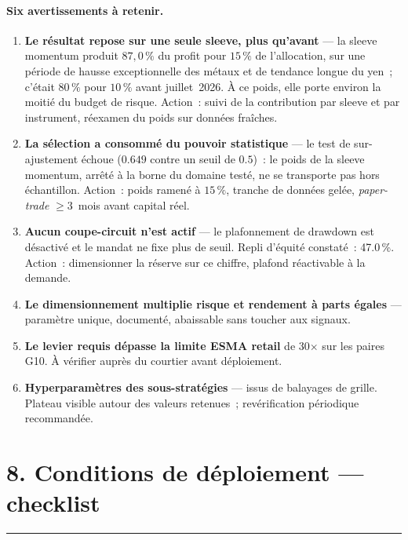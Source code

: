 \documentclass[11pt, a4paper]{scrartcl}
\begin{document}
\paragraph{Six avertissements à retenir.}
\begin{enumerate}[leftmargin=1.2em]
\item \textbf{Le résultat repose sur une seule sleeve, plus qu'avant} --- la sleeve
momentum produit $87{,}0\,\%$ du profit pour $15\,\%$ de l'allocation, sur une période de
hausse exceptionnelle des métaux et de tendance longue du yen~; c'était $80\,\%$ pour
$10\,\%$ avant juillet~2026. À ce poids, elle porte environ la moitié du budget de
risque. Action~: suivi de la contribution par sleeve et par instrument, réexamen du
poids sur données fraîches.
\item \textbf{La sélection a consommé du pouvoir statistique} --- le test de
sur-ajustement échoue ($0.649$ contre un seuil de $0.5$)~: le poids de la sleeve
momentum, arrêté à la borne du domaine testé, ne se transporte pas hors échantillon.
Action~: poids ramené à $15\,\%$, tranche de données gelée, \emph{paper-trade}
$\geq 3$~mois avant capital réel.
\item \textbf{Aucun coupe-circuit n'est actif} --- le plafonnement de drawdown est
désactivé et le mandat ne fixe plus de seuil. Repli d'équité constaté~: 47.0\,\%.
Action~: dimensionner la réserve sur ce chiffre, plafond réactivable à la demande.
\item \textbf{Le dimensionnement multiplie risque et rendement à parts égales} ---
paramètre unique, documenté, abaissable sans toucher aux signaux.
\item \textbf{Le levier requis dépasse la limite ESMA retail} de 30$\times$ sur les
paires G10. À vérifier auprès du courtier avant déploiement.
\item \textbf{Hyperparamètres des sous-stratégies} --- issus de balayages de grille.
Plateau visible autour des valeurs retenues~; revérification périodique recommandée.
\end{enumerate}


\section*{8. Conditions de déploiement --- checklist}
\vspace{-0.4em}
{\color{accent}\rule{\linewidth}{1.0pt}}\\[0.4em]
\end{document}
